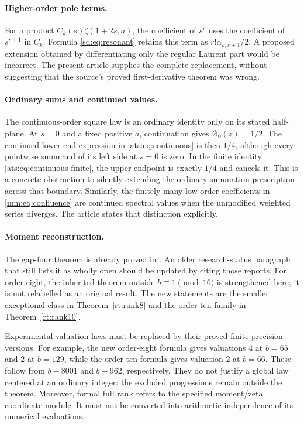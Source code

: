 \documentclass[11pt,a4paper]{article}
\numberwithin{equation}{section}
\theoremstyle{definition}
\theoremstyle{remark}
\begin{document}
\paragraph{Higher-order pole terms.}
For a product $C_k(s)\zeta(1+2s,a)$, the coefficient of $s^r$
uses the coefficient of $s^{r+1}$ in $C_k$. Formula
\eqref{sd:eq:resonant} retains this term as
$r!\alpha_{k,r+1}/2$. A proposed extension obtained by differentiating
only the regular Laurent part would be incorrect. The present article
supplies the complete replacement, without suggesting that the
source's proved first-derivative theorem was wrong.

\paragraph{Ordinary sums and continued values.}
The continuous-order square law is an ordinary identity only on its
stated half-plane. At $s=0$ and a fixed positive $a$, continuation gives
$\mathcal B_0(z)=1/2$. The continued lower-end expression in
\eqref{ats:eq:continuous} is then $1/4$, although every pointwise
summand of its left side at $s=0$ is zero. In the finite identity
\eqref{ats:eq:continuous-finite}, the upper endpoint is exactly $1/4$
and cancels it. This is a concrete obstruction to silently extending
the ordinary summation prescription across that boundary. Similarly,
the finitely many low-order coefficients in
\eqref{mm:eq:confluence} are continued spectral values when the
unmodified weighted series diverges. The article states that distinction
explicitly.

\paragraph{Moment reconstruction.}
The gap-four theorem is already proved in \cite{HTGC,HTST}. An older
research-status paragraph that still lists it as wholly open should
be updated by citing those reports. For order eight, the inherited
theorem outside $b\equiv1\pmod{16}$ is strengthened here; it is not
relabelled as an original result. The new statements are the smaller
exceptional class in Theorem~\ref{rt:rank8} and the order-ten family in
Theorem~\ref{rt:rank10}.

Experimental valuation laws must be replaced by their proved
finite-precision versions. For example, the new order-eight formula
gives valuations $4$ at $b=65$ and $2$ at $b=129$, while the
order-ten formula gives valuation $2$ at $b=66$.
These follow from $b-8001$ and $b-962$, respectively. They do not
justify a global law centered at an ordinary integer: the excluded
progressions remain outside the theorem. Moreover, formal full rank
refers to the specified moment/zeta coordinate module. It must not
be converted into arithmetic independence of its numerical evaluations.
\end{document}
